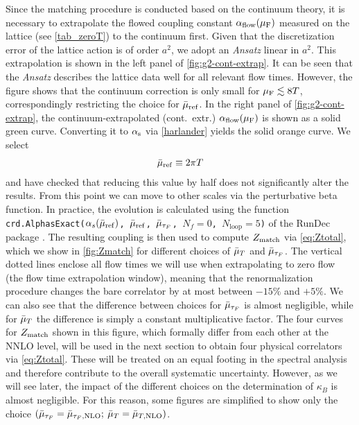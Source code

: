 \documentclass[floatfix,twocolumn,prd,showpacs,preprintnumbers,amsmath,nofootinbib,amssymb,superscriptaddress]{revtex4-2}
\begin{document}
Since the matching procedure is conducted based on the continuum theory, it is necessary to extrapolate the flowed coupling constant $\alpha_\mathrm{flow}(\mu_\mathrm{F})$ measured on the lattice (see \cref{tab_zeroT}) to the continuum first.
Given that the discretization error of the lattice action is of order $a^2$, we adopt an \textit{Ansatz} linear in $a^2$.
This extrapolation is shown in the left panel of \cref{fig:g2-cont-extrap}.
It can be seen that the \textit{Ansatz} describes the lattice data well for all relevant flow times. However, the figure shows that the continuum correction is only small for $\mu_\mathrm{F}\lesssim 8T$, correspondingly restricting the choice for $\bar{\mu}_\mathrm{ref}$.
In the right panel of \cref{fig:g2-cont-extrap}, the continuum-extrapolated (cont.~extr.) $\alpha_\mathrm{flow}(\mu_\mathrm{F})$ is shown as a solid green curve. Converting it to $\alpha_{\mathrm{s}}$ via \cref{harlander} yields the solid orange curve. 
We select 
\begin{align}
\bar{\mu}_\mathrm{ref} \equiv 2\pi T \label{eq:muref}
\end{align}
and have checked that reducing this value by half does not significantly alter the results.
From this point we can move to other scales via the perturbative beta function.
In practice, the evolution is calculated using the function \texttt{crd.AlphasExact($\alpha_s(\bar{\mu}_\mathrm{ref})$, $\bar{\mu}_\mathrm{ref}$, $\bar{\mu}_{\tau_F}$, $N_f=0$, $N_{\mathrm{loop}}=5$)} of the RunDec package \cite{Herren:2017osy, Chetyrkin:2000yt}.
The resulting coupling is then used to compute $Z_{\mathrm{match}}$ via \cref{eq:Ztotal}, which we show in \cref{fig:Zmatch} for different choices of $\bar{\mu}_{T}$ and $\bar{\mu}_{\tau_F}$.
The vertical dotted lines enclose all flow times we will use when extrapolating to zero flow (the flow time extrapolation window), meaning that the renormalization procedure changes the bare correlator by at most between $-15\%$ and $+5\%$. We can also see that the difference between choices for $\bar{\mu}_{\tau_F}$ is almost negligible, while for $\bar{\mu}_{T}$ the difference is simply a constant multiplicative factor.
The four curves for $Z_{\mathrm{match}}$ shown in this figure, which formally differ from each other at the NNLO level, will be used in the next section to obtain four physical correlators via \cref{eq:Ztotal}.
These will be treated on an equal footing in the spectral analysis and therefore contribute to the overall systematic uncertainty.
However, as we will see later, the impact of the different choices on the determination of $\kappa_B$ is almost negligible. 
For this reason, some figures are simplified to show only the choice $(\bar{\mu}_{\tau_F} = \bar{\mu}_{\tau_F,\mathrm{NLO}};\: \bar{\mu}_{T}=\bar{\mu}_{T,\mathrm{NLO}})$.
\end{document}
